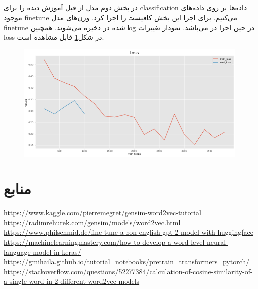\documentclass[10pt]{article}
\begin{document}
\subsection{}
در بخش دوم مدل 
از قبل آموزش دیده را برای classification داده‌ها بر روی داده‌های موجود finetune می‌کنیم. 
برای اجرا این بخش کافیست
را اجرا کرد. وزن‌های مدل finetune شده در 
ذخیره می‌شوند. همچنین log در حین اجرا در 
می‌باشد. نمودار تغییرات loss در شکل\ref{bert}
قابل مشاهده است.

\begin{figure}[ht!]
	\centering\includegraphics[width=\linewidth]{../reports/loss_history_Bert.png}
	\caption{ 
		}
	\label{bert}
\end{figure}


\newpage

\section{منابع}

\begin{flushleft}
	\url{https://www.kaggle.com/pierremegret/gensim-word2vec-tutorial}
	\url{https://radimrehurek.com/gensim/models/word2vec.html}
	\url{https://www.philschmid.de/fine-tune-a-non-english-gpt-2-model-with-huggingface}
	\url{https://machinelearningmastery.com/how-to-develop-a-word-level-neural-language-model-in-keras/}
	\url{https://gmihaila.github.io/tutorial_notebooks/pretrain_transformers_pytorch/}
	\url{https://stackoverflow.com/questions/52277384/calculation-of-cosine-similarity-of-a-single-word-in-2-different-word2vec-models}
\end{flushleft}
\end{document}
